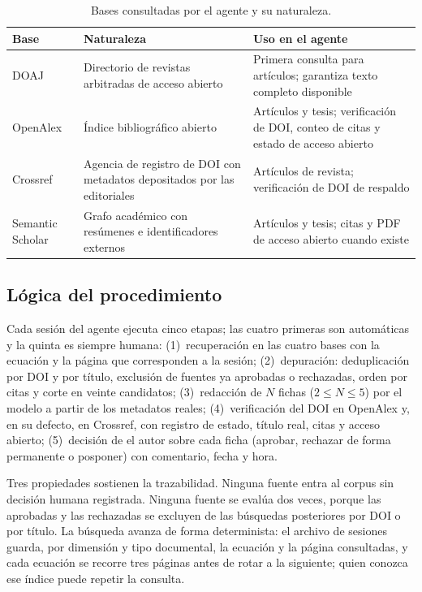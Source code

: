 \documentclass[letter,12pt]{article}
\begin{document}
\begin{table}[H]
\centering
\footnotesize
\caption{Bases consultadas por el agente y su naturaleza.}
\label{tab:bases}
\renewcommand{\arraystretch}{1.35}
\begin{tabular}{|p{2.6cm}|p{4.6cm}|p{5.2cm}|}
\hline
\rowcolor{bgCotejo}
\textbf{Base} & \textbf{Naturaleza} & \textbf{Uso en el agente} \\
\hline
DOAJ & Directorio de revistas arbitradas de acceso abierto & Primera consulta para artículos; garantiza texto completo disponible \\
\hline
OpenAlex & Índice bibliográfico abierto & Artículos y tesis; verificación de DOI, conteo de citas y estado de acceso abierto \\
\hline
Crossref & Agencia de registro de DOI con metadatos depositados por las editoriales & Artículos de revista; verificación de DOI de respaldo \\
\hline
Semantic Scholar & Grafo académico con resúmenes e identificadores externos & Artículos y tesis; citas y PDF de acceso abierto cuando existe \\
\hline
\end{tabular}
\end{table}

\subsection{Lógica del procedimiento}

Cada sesión del agente ejecuta cinco etapas; las cuatro primeras son automáticas y la quinta es siempre humana: (1)~recuperación en las cuatro bases con la ecuación y la página que corresponden a la sesión; (2)~depuración: deduplicación por DOI y por título, exclusión de fuentes ya aprobadas o rechazadas, orden por citas y corte en veinte candidatos; (3)~redacción de $N$ fichas ($2 \le N \le 5$) por el modelo a partir de los metadatos reales; (4)~verificación del DOI en OpenAlex y, en su defecto, en Crossref, con registro de estado, título real, citas y acceso abierto; (5)~decisión de el autor sobre cada ficha (aprobar, rechazar de forma permanente o posponer) con comentario, fecha y hora.

Tres propiedades sostienen la trazabilidad. Ninguna fuente entra al corpus sin decisión humana registrada. Ninguna fuente se evalúa dos veces, porque las aprobadas y las rechazadas se excluyen de las búsquedas posteriores por DOI o por título. La búsqueda avanza de forma determinista: el archivo de sesiones guarda, por dimensión y tipo documental, la ecuación y la página consultadas, y cada ecuación se recorre tres páginas antes de rotar a la siguiente; quien conozca ese índice puede repetir la consulta.
\end{document}
